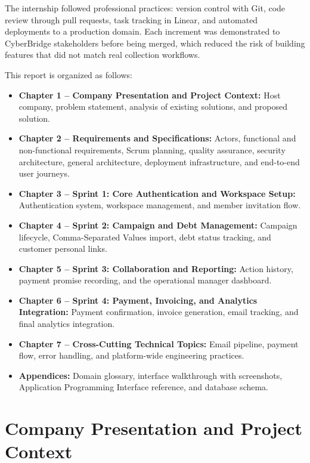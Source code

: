 \documentclass[12pt,a4paper]{report}
\begin{document}
The internship followed professional practices: version control with Git, code review through
pull requests, task tracking in Linear, and automated deployments to a production domain.
Each increment was demonstrated to CyberBridge stakeholders before being merged, which reduced
the risk of building features that did not match real collection workflows.

This report is organized as follows:

\begin{itemize}
  \item \textbf{Chapter 1 -- Company Presentation and Project Context:}
        Host company, problem statement, analysis of existing solutions, and proposed solution.
  \item \textbf{Chapter 2 -- Requirements and Specifications:}
        Actors, functional and non-functional requirements, Scrum planning,
        quality assurance, security architecture, general architecture, deployment infrastructure,
        and end-to-end user journeys.
  \item \textbf{Chapter 3 -- Sprint 1: Core Authentication and Workspace Setup:}
        Authentication system, workspace management, and member invitation flow.
  \item \textbf{Chapter 4 -- Sprint 2: Campaign and Debt Management:}
        Campaign lifecycle, Comma-Separated Values import, debt status tracking, and customer personal links.
  \item \textbf{Chapter 5 -- Sprint 3: Collaboration and Reporting:}
        Action history, payment promise recording, and the operational manager dashboard.
  \item \textbf{Chapter 6 -- Sprint 4: Payment, Invoicing, and Analytics Integration:}
        Payment confirmation, invoice generation, email tracking, and final analytics integration.
  \item \textbf{Chapter 7 -- Cross-Cutting Technical Topics:}
        Email pipeline, payment flow, error handling, and platform-wide engineering practices.
  \item \textbf{Appendices:}
        Domain glossary, interface walkthrough with screenshots, Application Programming Interface reference,
        and database schema.
\end{itemize}

\chapter{Company Presentation and Project Context}
\end{document}
